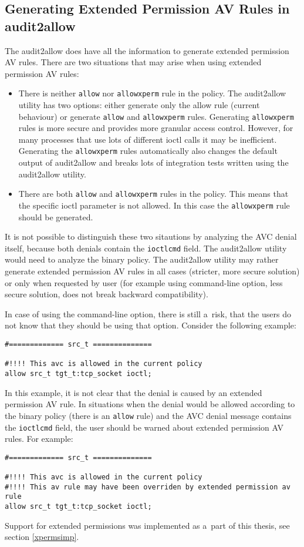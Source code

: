 \subsection{Generating Extended Permission AV Rules in audit2allow}
The audit2allow does have all the information to generate extended permission AV
rules. There are two situations that may arise when using extended permission AV
rules:
\begin{itemize}
    \item There is neither \texttt{allow} nor \texttt{allowxperm} rule in the
        policy. The audit2allow utility has two options: either generate only
        the allow rule (current behaviour) or generate \texttt{allow} and
        \texttt{allowxperm} rules. Generating \texttt{allowxperm} rules is more
        secure and provides more granular access control. However, for many
        processes that use lots of different ioctl calls it may be inefficient.
        Generating the \texttt{allowxperm} rules automatically also changes the
        default output of audit2allow and breaks lots of integration tests
        written using the audit2allow utility.
    \item There are both \texttt{allow} and \texttt{allowxperm} rules in the
        policy. This means that the specific ioctl parameter is not allowed. In
        this case the \texttt{allowxperm} rule should be generated.
\end{itemize}

It is not possible to distinguish these two sitautions by analyzing the AVC
denial itself, because both denials contain the \texttt{ioctlcmd} field. The
audit2allow utility would need to analyze the binary policy. The audit2allow
utility may rather generate extended permission AV rules in all cases (stricter,
more secure solution) or only when requested by user (for example using
command-line option, less secure solution, does not break backward
compatibility).

In case of using the command-line option, there is still a~risk, that the users
do not know that they should be using that option. Consider the following
example:
\begin{lstlisting}
#============= src_t ==============

#!!!! This avc is allowed in the current policy
allow src_t tgt_t:tcp_socket ioctl;
\end{lstlisting}
In this example, it is not clear that the denial is caused by an extended
permission AV rule. In situations when the denial would be allowed according to
the binary policy (there is an \texttt{allow} rule) and the AVC denial message
contains the \texttt{ioctlcmd} field, the user should be warned about extended
permission AV rules. For example:
\begin{lstlisting}
#============= src_t ==============

#!!!! This avc is allowed in the current policy
#!!!! This av rule may have been overriden by extended permission av rule
allow src_t tgt_t:tcp_socket ioctl;
\end{lstlisting}
Support for extended permissions was implemented as a~part of this thesis, see
section \ref{xpermsimp}.

